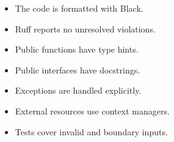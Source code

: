 \begin{itemize}
    \item[\(\square\)]  The code is formatted with Black.
    \item[\(\square\)]  Ruff reports no unresolved violations.
    \item[\(\square\)]  Public functions have type hints.
    \item[\(\square\)]  Public interfaces have docstrings.
    \item[\(\square\)]  Exceptions are handled explicitly.
    \item[\(\square\)]  External resources use context managers.
    \item[\(\square\)]  Tests cover invalid and boundary inputs.
\end{itemize}
